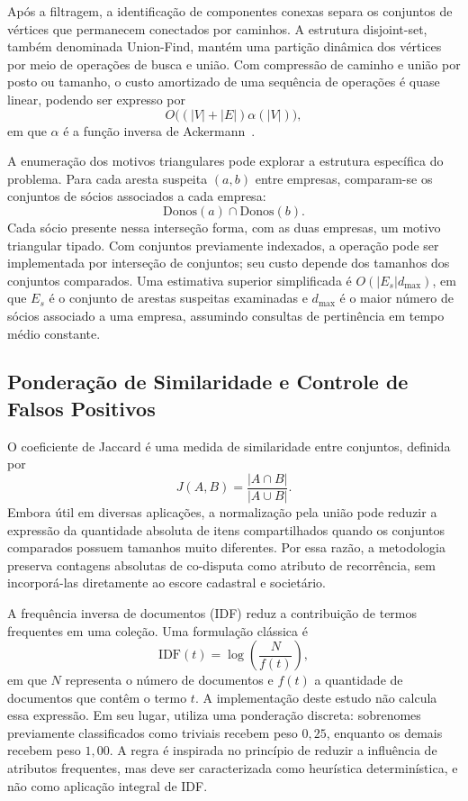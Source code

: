 Após a filtragem, a identificação de componentes conexas separa os conjuntos de vértices que permanecem conectados por caminhos. A estrutura disjoint-set, também denominada Union-Find, mantém uma partição dinâmica dos vértices por meio de operações de busca e união. Com compressão de caminho e união por posto ou tamanho, o custo amortizado de uma sequência de operações é quase linear, podendo ser expresso por
\begin{equation}
  O\big((|V|+|E|)\alpha(|V|)\big),
  \label{eq:complexidade_union_find}
\end{equation}
em que $\alpha$ é a função inversa de Ackermann~\cite{tarjan1975efficiency}.

A enumeração dos motivos triangulares pode explorar a estrutura específica do problema. Para cada aresta suspeita $(a,b)$ entre empresas, comparam-se os conjuntos de sócios associados a cada empresa:
\begin{equation}
  \mathrm{Donos}(a)\cap\mathrm{Donos}(b).
  \label{eq:intersecao_donos}
\end{equation}
Cada sócio presente nessa interseção forma, com as duas empresas, um motivo triangular tipado. Com conjuntos previamente indexados, a operação pode ser implementada por interseção de conjuntos; seu custo depende dos tamanhos dos conjuntos comparados. Uma estimativa superior simplificada é $O(|E_s|d_{\max})$, em que $E_s$ é o conjunto de arestas suspeitas examinadas e $d_{\max}$ é o maior número de sócios associado a uma empresa, assumindo consultas de pertinência em tempo médio constante.

\subsection{Ponderação de Similaridade e Controle de Falsos Positivos}

O coeficiente de Jaccard é uma medida de similaridade entre conjuntos, definida por
\begin{equation}
  J(A,B)=\frac{|A\cap B|}{|A\cup B|}.
\end{equation}
Embora útil em diversas aplicações, a normalização pela união pode reduzir a expressão da quantidade absoluta de itens compartilhados quando os conjuntos comparados possuem tamanhos muito diferentes. Por essa razão, a metodologia preserva contagens absolutas de co-disputa como atributo de recorrência, sem incorporá-las diretamente ao escore cadastral e societário.

A frequência inversa de documentos (IDF) reduz a contribuição de termos frequentes em uma coleção. Uma formulação clássica é
\begin{equation}
  \mathrm{IDF}(t)=\log\left(\frac{N}{f(t)}\right),
\end{equation}
em que $N$ representa o número de documentos e $f(t)$ a quantidade de documentos que contêm o termo $t$. A implementação deste estudo não calcula essa expressão. Em seu lugar, utiliza uma ponderação discreta: sobrenomes previamente classificados como triviais recebem peso $0{,}25$, enquanto os demais recebem peso $1{,}00$. A regra é inspirada no princípio de reduzir a influência de atributos frequentes, mas deve ser caracterizada como heurística determinística, e não como aplicação integral de IDF.

